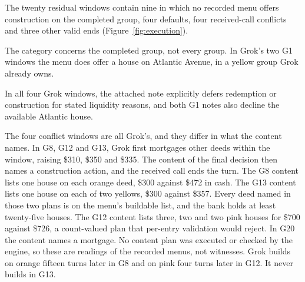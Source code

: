 

The twenty residual windows contain nine in which no recorded menu offers construction on the completed group, four defaults, four received-call conflicts and three other valid ends (Figure~\ref{fig:execution}).

The category concerns the completed group, not every group. In Grok's two G1 windows the menu does offer a house on Atlantic Avenue, in a yellow group Grok already owns.

In all four Grok windows, the attached note explicitly defers redemption or construction for stated liquidity reasons, and both G1 notes also decline the available Atlantic house.

The four conflict windows are all Grok's, and they differ in what the content names. In G8, G12 and G13, Grok first mortgages other deeds within the window, raising \$310, \$350 and \$335. The content of the final decision then names a construction action, and the received call ends the turn. The G8 content lists one house on each orange deed, \$300 against \$472 in cash. The G13 content lists one house on each of two yellows, \$300 against \$357. Every deed named in those two plans is on the menu's buildable list, and the bank holds at least twenty-five houses. The G12 content lists three, two and two pink houses for \$700 against \$726, a count-valued plan that per-entry validation would reject. In G20 the content names a mortgage. No content plan was executed or checked by the engine, so these are readings of the recorded menus, not witnesses. Grok builds on orange fifteen turns later in G8 and on pink four turns later in G12. It never builds in G13.

